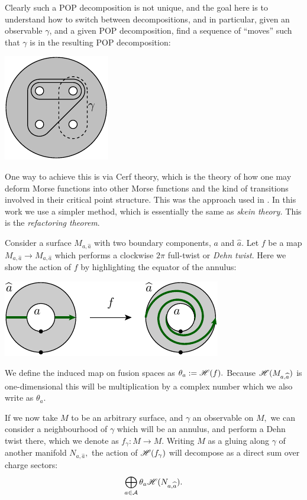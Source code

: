 \documentclass[aps, prl, letterpaper, twocolumn, superscriptaddress, notitlepage, 10pt]{revtex4-1}
\begin{document}
Clearly such a POP decomposition is not unique,
and the goal here is to understand how to switch between decompositions,
and in particular, given an observable $\gamma$,
and a given POP decomposition, find a sequence
of ``moves'' such that $\gamma$ is in the resulting POP
decomposition:
\begin{center}
\includegraphics[]{pic-refactor.pdf}
\end{center}

One way to achieve this is via Cerf theory, which is the theory
of how one may deform Morse functions into other Morse functions
and the kind of transitions involved in their critical point structure.
This was the approach used in \cite{Freedman2002simulation}.
In this work we use a simpler method,
which is essentially the same as \emph{skein theory.}
This is the \emph{refactoring theorem}.

Consider a surface $M_{a,\widehat{a}}$
with two boundary components, $a$ and $\widehat{a}.$
Let $f$ be a map $M_{a,\widehat{a}}\to M_{a,\widehat{a}}$
which performs a clockwise $2\pi$ full-twist or \emph{Dehn twist}.
Here we show the action of $f$ by highlighting the
equator of the annulus:
\begin{center}
\includegraphics[]{pic-dehn-twist.pdf}
\end{center}
We define the 
induced map on fusion spaces as $\theta_a := \mathscr{H}(f).$
Because $\mathscr{H}(M_{a,\widehat{a}})$ is one-dimensional
this will be multiplication by a complex number which we also
write as $\theta_a.$

If we now take $M$ to be an arbitrary surface, and $\gamma$ an
observable on $M,$ we can consider a neighbourhood of $\gamma$
which will be an annulus, and perform a Dehn twist there,
which we denote as $f_\gamma : M\to M.$
Writing $M$ as a gluing along $\gamma$ of another
manifold $N_{a,\widehat{a}},$
the action of $\mathscr{H}(f_\gamma)$ will decompose as a direct sum over charge 
sectors:
$$
\bigoplus_{a\in\mathcal{A}} \theta_a \mathscr{H}(N_{a,\widehat{a}}).
$$
\end{document}
